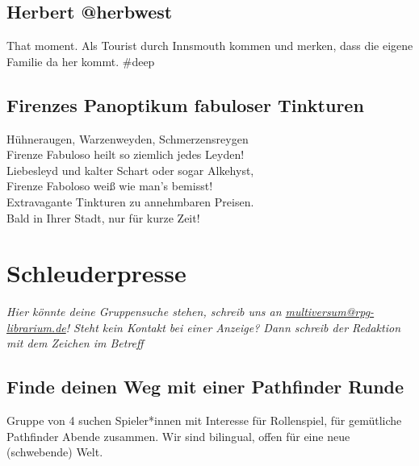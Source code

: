 \documentclass[final]{multiversum}
\begin{document}
\subsection{Herbert @herbwest}
That moment. Als Tourist durch Innsmouth kommen und merken, dass die eigene Familie da her kommt. \#deep

\subsection{Firenzes Panoptikum fabuloser Tinkturen}
Hühneraugen, Warzenweyden, Schmerzensreygen\\
Firenze Fabuloso heilt so ziemlich jedes Leyden!\\
Liebesleyd und kalter Schart oder sogar Alkehyst,\\
Firenze Faboloso weiß wie man's bemisst!\\[\baselineskip]
Extravagante Tinkturen zu annehmbaren Preisen.\\
Bald in Ihrer Stadt, nur für kurze Zeit! 

\section{Schleuderpresse}
\textit{Hier könnte deine Gruppensuche stehen, schreib uns an \href{mailto:multiversum@rpg-librarium.de}{multiversum@rpg-librarium.de}! 
Steht kein Kontakt bei einer Anzeige? Dann schreib der Redaktion mit dem Zeichen im Betreff}

\subsection{Finde deinen Weg mit einer Pathfinder Runde}
Gruppe von 4 suchen Spieler*innen mit Interesse für Rollenspiel, für gemütliche Pathfinder Abende zusammen.
Wir sind bilingual, offen für eine neue (schwebende) Welt.

\impressum
\end{document}
